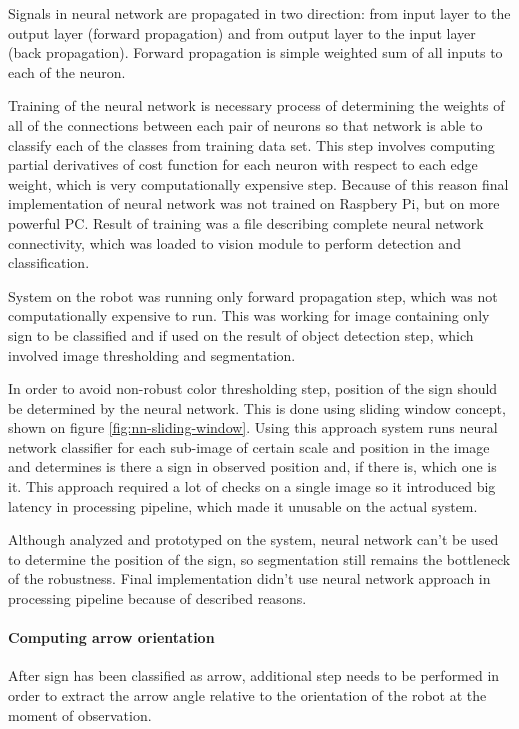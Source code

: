 Signals in neural network are propagated in two direction: from input layer to the output layer (forward propagation) and from output layer to the input layer (back propagation). Forward propagation is simple weighted sum of all inputs to each of the neuron.

Training of the neural network is necessary process of determining the weights of all of the connections between each pair of neurons so that network is able to classify each of the classes from training data set. This step involves computing partial derivatives of cost function for each neuron with respect to each edge weight, which is very computationally expensive step. Because of this reason final implementation of neural network was not trained on Raspbery Pi, but on more powerful PC. Result of training was a file describing complete neural network connectivity, which was loaded to vision module to perform detection and classification. 

System on the robot was running only forward propagation step, which was not computationally expensive to run. This was working for image containing only sign to be classified and if used on the result of object detection step, which involved image thresholding and segmentation.

In order to avoid non-robust color thresholding step, position of the sign should be determined by the neural network. This is done using sliding window concept, shown on figure \ref{fig:nn-sliding-window}. Using this approach system runs neural network classifier for each sub-image of certain scale and position in the image and determines is there a sign in observed position and, if there is, which one is it. This approach required a lot of checks on a single image so it introduced big latency in processing pipeline, which made it unusable on the actual system. 

Although analyzed and prototyped on the system, neural network can't be used to determine the position of the sign, so segmentation still remains the bottleneck of the robustness. Final implementation didn't use neural network approach in processing pipeline because of described reasons.

\paragraph{Computing arrow orientation}

After sign has been classified as arrow, additional step needs to be performed in order to extract the arrow angle relative to the orientation of the robot at the moment of observation.

